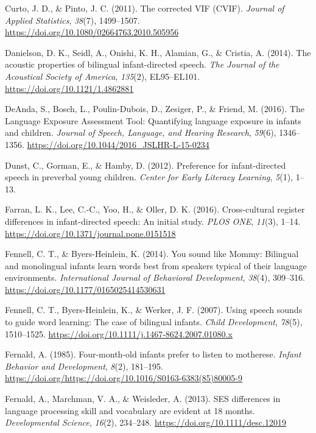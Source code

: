 \documentclass[
  english,
  ,man,floatsintext]{apa6}
\begin{document}
\leavevmode\hypertarget{ref-curto_2011}{}%
Curto, J. D., \& Pinto, J. C. (2011). The corrected VIF (CVIF). \emph{Journal of Applied Statistics}, \emph{38}(7), 1499--1507. \url{https://doi.org/10.1080/02664763.2010.505956}

\leavevmode\hypertarget{ref-danielson_2014}{}%
Danielson, D. K., Seidl, A., Onishi, K. H., Alamian, G., \& Cristia, A. (2014). The acoustic properties of bilingual infant-directed speech. \emph{The Journal of the Acoustical Society of America}, \emph{135}(2), EL95--EL101. \url{https://doi.org/10.1121/1.4862881}

\leavevmode\hypertarget{ref-deanda_2016}{}%
DeAnda, S., Bosch, L., Poulin-Dubois, D., Zesiger, P., \& Friend, M. (2016). The Language Exposure Assessment Tool: Quantifying language exposure in infants and children. \emph{Journal of Speech, Language, and Hearing Research}, \emph{59}(6), 1346--1356. \url{https://doi.org/10.1044/2016_JSLHR-L-15-0234}

\leavevmode\hypertarget{ref-dunst_2012}{}%
Dunst, C., Gorman, E., \& Hamby, D. (2012). Preference for infant-directed speech in preverbal young children. \emph{Center for Early Literacy Learning}, \emph{5}(1), 1--13.

\leavevmode\hypertarget{ref-farran_2016}{}%
Farran, L. K., Lee, C.-C., Yoo, H., \& Oller, D. K. (2016). Cross-cultural register differences in infant-directed speech: An initial study. \emph{PLOS ONE}, \emph{11}(3), 1--14. \url{https://doi.org/10.1371/journal.pone.0151518}

\leavevmode\hypertarget{ref-fennell_2014}{}%
Fennell, C. T., \& Byers-Heinlein, K. (2014). You sound like Mommy: Bilingual and monolingual infants learn words best from speakers typical of their language environments. \emph{International Journal of Behavioral Development}, \emph{38}(4), 309--316. \url{https://doi.org/10.1177/0165025414530631}

\leavevmode\hypertarget{ref-fennell_2007}{}%
Fennell, C. T., Byers-Heinlein, K., \& Werker, J. F. (2007). Using speech sounds to guide word learning: The case of bilingual infants. \emph{Child Development}, \emph{78}(5), 1510--1525. \url{https://doi.org/10.1111/j.1467-8624.2007.01080.x}

\leavevmode\hypertarget{ref-fernald_1985}{}%
Fernald, A. (1985). Four-month-old infants prefer to listen to motherese. \emph{Infant Behavior and Development}, \emph{8}(2), 181--195. \url{https://doi.org/https://doi.org/10.1016/S0163-6383(85)80005-9}

\leavevmode\hypertarget{ref-fernald_2013}{}%
Fernald, A., Marchman, V. A., \& Weisleder, A. (2013). SES differences in language processing skill and vocabulary are evident at 18 months. \emph{Developmental Science}, \emph{16}(2), 234--248. \url{https://doi.org/10.1111/desc.12019}
\end{document}
